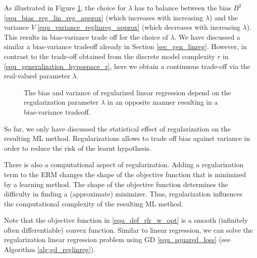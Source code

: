 \documentclass[12pt]{report}
\begin{document}
As illustrated in Figure \ref{fig_bias_variance_lambda}, the choice for $\lambda$ has 
to balance between the bias $B^{2}$ \eqref{equ_bias_reg_lin_reg_approx} 
(which increases with increasing $\lambda$) and the variance $V$ \eqref{equ_variance_reglinreg_approx} 
(which decreases with increasing $\lambda$). This results in bias-variance trade 
off for the choice of $\lambda$. We have discussed a similar a bias-variance tradeoff 
already in Section \ref{sec_gen_linreg}. However, in contrast to the trade-off 
obtained from the discrete model complexity $r$ in \eqref{equ_generalization_hypospace_r}, 
here we obtain a continuous trade-off via the real-valued parameter $\lambda$. 


\begin{figure}
\begin{center}
\end{center}
\caption{The bias and variance of regularized linear regression depend on the regularization parameter 
$\lambda$ in an opposite manner resulting in a bias-variance tradeoff.}
\label{fig_bias_variance_lambda}
\end{figure}


So far, we only have discussed the statistical effect of regularization on the 
resulting ML method. Regularizations allows to trade off bias against variance 
in order to reduce the risk of the learnt hypothesis. 

There is also a computational aspect of regularization. Adding a regularization 
term to the ERM changes the shape of the objective function that is minimized 
by a learning method. The shape of the objective function determines the difficulty 
in finding a (approximate) minimizer. Thus, regularization influences the computational
complexity of the resulting ML method.  

Note that the objective function in \eqref{equ_def_rlr_w_opt} is a smooth (infinitely often differentiable) 
convex function. Similar to linear regression, we can solve the regularization 
linear regression problem using GD \eqref{equ_squared_loss} 
(see Algorithm \ref{alg:gd_reglinreg}). 
\end{document}

